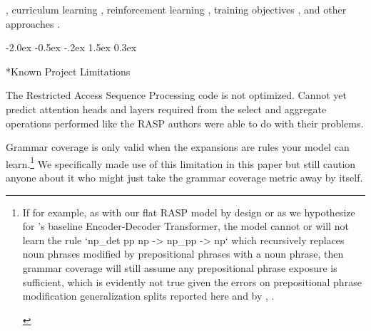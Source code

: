 \documentclass[11pt]{article}
\makeatletter
\renewcommand\section{\@startsection{section}{1}{\z@}%
                                  {-2.0ex \@plus -0.5ex \@minus -.2ex}%
                                  {1.5ex \@plus 0.3ex}%
                                  {\large\bfseries\raggedright}}
\makeatother
\begin{document}
{\begin{footnotesize}
\end{footnotesize}}, curriculum learning \citep{10.1145/1553374.1553380}, reinforcement learning \citep{Ranzato2015}, training objectives \citep{10.1162/tacl_a_00733}, and other approaches \citep{Csordas2021} \citep{ontanon-etal-2022-making}.

\clearpage
\section*{Known Project Limitations}

The Restricted Access Sequence Processing code is not optimized. Cannot yet predict attention heads and layers required from the select and aggregate operations performed like the RASP authors \citep{Weiss2021} were able to do with their problems.

Grammar coverage \citep{fuzzingbook2023:GrammarCoverageFuzzer} is only valid when the expansions are rules your model can learn.\footnote{\begin{footnotesize}If for example, as with our flat RASP model by design or as we hypothesize for \citep{Wu2023}'s baseline Encoder-Decoder Transformer, the model cannot or will not learn the rule `np\_det pp np -> np\_pp -> np` which recursively replaces noun phrases modified by prepositional phrases with a noun phrase, then grammar coverage will still assume any prepositional phrase exposure is sufficient, which is evidently not true given the errors on prepositional phrase modification generalization splits reported here and by \citep{Wu2023}, \citep{KimLinzen2020}.
\end{footnotesize}
} We specifically made use of this limitation in this paper but still caution anyone about it who might just take the grammar coverage metric away by itself.
\end{document}

